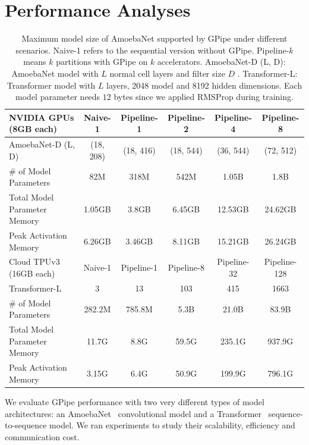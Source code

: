 \documentclass{article}
\def\codename{GPipe}
\begin{document}
\section{Performance Analyses}
\begin{table}[t]
\begin{small}
\begin{center}
\caption{Maximum model size of AmoebaNet supported by \codename{} under different scenarios. Naive-1 refers to the sequential version without \codename{}. Pipeline-$k$ means $k$ partitions with \codename{} on $k$ accelerators. AmoebaNet-D (L, D): AmoebaNet model with $L$ normal cell layers and filter size $D$ .  Transformer-L: Transformer model with $L$ layers, 2048 model and 8192 hidden dimensions. Each model parameter needs $12$ bytes since we applied RMSProp during training.}
\label{results_memory_tab}
\begin{tabular}{lccccc}
\toprule
 NVIDIA GPUs (8GB each) & Naive-1  & Pipeline-1 & Pipeline-2 & Pipeline-4 & Pipeline-8  \\
\midrule
AmoebaNet-D (L, D) &  (18, 208) & (18, 416) &  (18, 544) & (36, 544) & (72, 512) \\
\# of Model Parameters & 82M & 318M & 542M & 1.05B & 1.8B \\
Total Model Parameter Memory & 1.05GB & 3.8GB & 6.45GB & 12.53GB & 24.62GB \\ 
Peak Activation Memory & 6.26GB & 3.46GB & 8.11GB & 15.21GB & 26.24GB\\ 
\midrule
 Cloud TPUv3 (16GB each) & Naive-1  & Pipeline-1  & Pipeline-8 & Pipeline-32 & Pipeline-128  \\
\midrule
Transformer-L & 3   & 13 & 103 & 415 & 1663 \\
\# of Model Parameters & 282.2M & 785.8M & 5.3B  & 21.0B & 83.9B \\
Total Model Parameter Memory & 11.7G & 8.8G  &  59.5G & 235.1G & 937.9G \\ 
Peak Activation Memory & 3.15G & 6.4G  &  50.9G & 199.9G & 796.1G \\ 
\bottomrule
\end{tabular}
\end{center}
\end{small}
\end{table}


We evaluate \codename{} performance with two very different types of model architectures: an AmoebaNet~\cite{real2018regularized} convolutional model and a Transformer~\cite{vaswani2017attention}  sequence-to-sequence model. We ran experiments to study their scalability, efficiency and communication cost.
\end{document}
